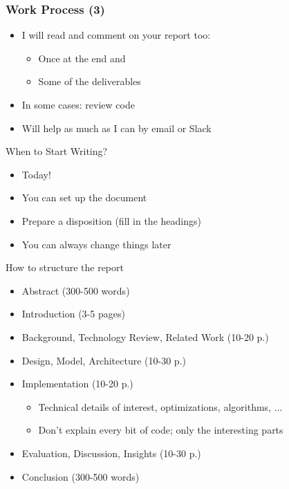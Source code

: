 \documentclass[hyperref={pdfpagelabels=false}, aspectratio=1610]{beamer}
\begin{document}
\begin{frame}
\frametitle{Work Process (3)}
\begin{block}{}
 \begin{itemize}
  \item I will read and comment on your report too:
  \begin{itemize}
  	\item Once at the end and
  	\item Some of the deliverables
  \end{itemize}
  \item In some cases: review code
  \item Will help as much as I can by email or Slack
 \end{itemize}
\end{block}
\end{frame}


\begin{frame}
\begin{block}{When to Start Writing?}
 \begin{itemize}
  \item<2-> Today!
  \item<3-> You can set up the document 
  \item<4-> Prepare a disposition (fill in the headings)
  \item<5-> You can always change things later
 \end{itemize}
\end{block}
\end{frame}


\begin{frame}
\begin{block}{How to structure the report}
 \begin{itemize}
  \item Abstract (300-500 words)
  \item Introduction (3-5 pages)
  \item Background, Technology Review, Related Work (10-20 p.)
  \item Design, Model, Architecture (10-30 p.)
  \item Implementation (10-20 p.)
  \begin{itemize}
   \item Technical details of interest, optimizations, algorithms, ...
   \item Don't explain every bit of code; only the interesting parts
  \end{itemize}
  \item Evaluation, Discussion, Insights (10-30 p.)
  \item Conclusion (300-500 words)
 \end{itemize}
\end{block}
\end{frame}
\end{document}
